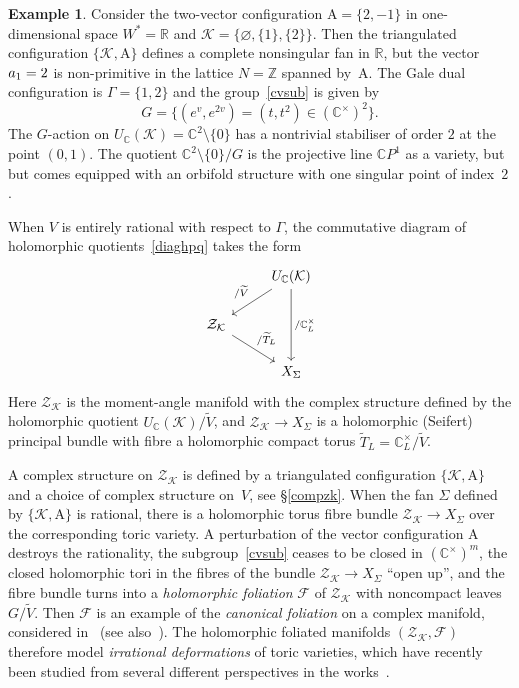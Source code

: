 \documentclass[a4paper]{amsart}
\theoremstyle{definition}
\newtheorem{example}[theorem]{Example}
\theoremstyle{remark}
\numberwithin{equation}{section}
\def\R{\mathbb R}
\def\C{\mathbb C}
\def\R{\mathbb R}
\def\Z{\mathbb Z}
\def\sK{\mathcal K}
\newcommand{\mb}[1]{{\textbf {\textit#1}}}
\newcommand{\zk}{\mathcal Z_{\mathcal K}}
\newcommand{\<}{\langle}
\renewcommand{\>}{\rangle}
\begin{document}
\begin{example}
Consider the two-vector configuration $\mathrm A=\{2,-1\}$ in one-dimensional space $W^*=\R$ and $\mathcal K=\{\varnothing,\{1\},\{2\}\}$. Then the triangulated configuration $\{\mathcal K,\mathrm A\}$ defines a complete nonsingular fan in $\R$, but the vector $\mb a_1=2$ is non-primitive in the lattice $N=\Z$ spanned by~$\mathrm A$. The Gale dual configuration is $\Gamma=\{1,2\}$ and the group~\eqref{cvsub} is given by
\[
  G=\{(e^v,e^{2v})=(t,t^2)\in (\C^\times)^2\}.
\]
The $G$-action on $U_\C(\mathcal K)=\C^2\setminus\{0\}$ has a nontrivial stabiliser of order $2$ at the point $(0,1)$.
The quotient $\C^2\setminus\{0\}/G$ is the projective line $\C P^1$ as a variety, but 
but comes equipped with an orbifold structure with one singular point of index~$2$.
\end{example}

When $V$ is entirely rational with respect to $\Gamma$, the commutative diagram of holomorphic quotients~\eqref{diaghpq} takes the form
\[
\begin{tikzcd}
  & U_\C(\sK) \ar{dd}{/\C^\times_L} \ar{ld}[swap]{/\widetilde V}\\
  \zk%
  \ar{rd}{/\widetilde T_L}\\
   & X_\Sigma
 \end{tikzcd}
\]
Here $\zk$ is the moment-angle manifold with the complex structure defined by the holomorphic quotient $U_\C(\sK)/\widetilde V$, and $\zk\to X_\Sigma$ is a holomorphic (Seifert) principal bundle with fibre a holomorphic compact torus $\widetilde T_L=\C^\times_L/\widetilde V$.

A complex structure on $\zk$ is defined by a triangulated configuration $\{\sK,\mathrm A\}$ and a choice of complex structure on~$V$, see \S\ref{compzk}. When the fan $\Sigma$ defined by $\{\sK,\mathrm A\}$ is rational, there is a holomorphic torus fibre bundle $\zk\to X_\Sigma$ over the corresponding toric variety. A perturbation of the vector configuration $\mathrm A$ destroys the rationality, the subgroup~\eqref{cvsub} ceases to be closed in  $(\C^\times)^m$, the closed holomorphic tori in the fibres of the bundle $\zk\to X_\Sigma$ ``open up'', and the fibre bundle turns into a \emph{holomorphic foliation} $\mathcal F$ of $\zk$ with noncompact leaves $G/\widetilde V$. Then $\mathcal F$ is an example of the \emph{canonical foliation} on a complex manifold, considered in~\cite{is-ka19} (see also~\cite{i-k-p22}). The holomorphic foliated manifolds $(\zk,\mathcal F)$ therefore model \emph{irrational deformations} of toric varieties, which have recently been studied from several different perspectives in 
the works~\cite{ba-pr01, ba-za15, ra-zu19, k-l-m-v21, i-k-p22, ba-pr23}.
\end{document}
